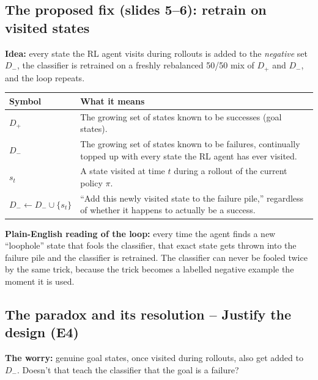 \documentclass[11pt]{article}
\begin{document}
\subsection{The proposed fix (slides 5--6): retrain on visited states}
\textbf{Idea:} every state the RL agent visits during rollouts is added to the
\emph{negative} set $D_-$, the classifier is retrained on a freshly rebalanced
50/50 mix of $D_+$ and $D_-$, and the loop repeats.

\begin{center}
\begin{tabular}{|>{\raggedright\arraybackslash}p{3.2cm}|>{\raggedright\arraybackslash}p{10.3cm}|}
\hline
\textbf{Symbol} & \textbf{What it means} \\
\hline
$D_+$ & The growing set of states known to be successes (goal states). \\
\hline
$D_-$ & The growing set of states known to be failures, continually topped up with
every state the RL agent has ever visited. \\
\hline
$s_t$ & A state visited at time $t$ during a rollout of the current policy $\pi$. \\
\hline
$D_- \leftarrow D_- \cup \{s_t\}$ & ``Add this newly visited state to the failure
pile,'' regardless of whether it happens to actually be a success. \\
\hline
\end{tabular}
\end{center}
\textbf{Plain-English reading of the loop:} every time the agent finds a new
``loophole'' state that fools the classifier, that exact state gets thrown into
the failure pile and the classifier is retrained. The classifier can never be
fooled twice by the same trick, because the trick becomes a labelled negative
example the moment it is used.

\subsection{The paradox and its resolution -- Justify the design (E4)}
\textbf{The worry:} genuine goal states, once visited during rollouts, also get
added to $D_-$. Doesn't that teach the classifier that the goal is a failure?
\end{document}
